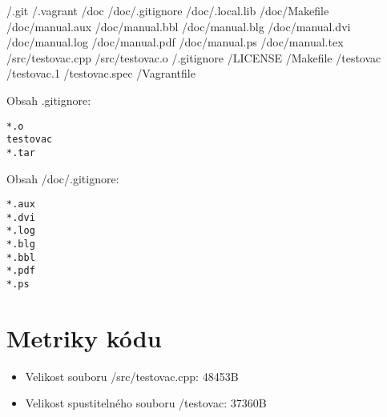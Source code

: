 \documentclass[a4paper,11pt]{article}
\begin{document}
/.git \newline
/.vagrant \newline
/doc \newline
/doc/.gitignore \newline
/doc/.local.lib \newline
/doc/Makefile \newline
/doc/manual.aux \newline
/doc/manual.bbl \newline
/doc/manual.blg \newline
/doc/manual.dvi \newline
/doc/manual.log \newline
/doc/manual.pdf \newline
/doc/manual.ps \newline
/doc/manual.tex \newline
/src/testovac.cpp \newline
/src/testovac.o \newline
/.gitignore \newline
/LICENSE \newline
/Makefile \newline
/testovac \newline
/testovac.1 \newline
/testovac.spec \newline
/Vagrantfile \newline

Obsah .gitignore:

\begin{lstlisting}[frame=single,breaklines]
*.o
testovac
*.tar
\end{lstlisting}

Obsah /doc/.gitignore:

\begin{lstlisting}[frame=single,breaklines]
*.aux
*.dvi
*.log
*.blg
*.bbl
*.pdf
*.ps
\end{lstlisting}

\section*{Metriky kódu}
\begin{itemize}
  \item Velikost souboru /src/testovac.cpp: 48453B
  \item Velikost spustitelného souboru /testovac: 37360B
\end{itemize}
\end{document}

